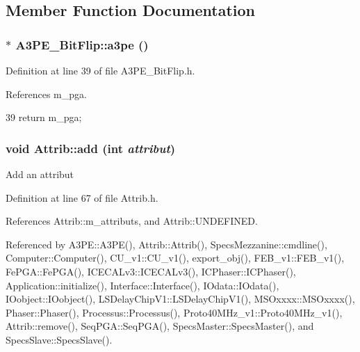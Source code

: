 \subsection{Member Function Documentation}
\hypertarget{classA3PE__BitFlip_ac0d0747dfdd99084dd5524fea62f11d6}{
\subsubsection[{a3pe}]{$\ast$ A3PE\_\-BitFlip::a3pe ()}}
\label{classA3PE__BitFlip_ac0d0747dfdd99084dd5524fea62f11d6}


Definition at line 39 of file A3PE\_\-BitFlip.h.

References m\_\-pga.


\begin{DoxyCode}
39 {return m_pga;}
\end{DoxyCode}
\hypertarget{classAttrib_a235f773af19c900264a190b00a3b4ad7}{
\subsubsection[{add}]{\setlength{\rightskip}{0pt plus 5cm}void Attrib::add (int {\em attribut})}}
\label{classAttrib_a235f773af19c900264a190b00a3b4ad7}
Add an attribut 

Definition at line 67 of file Attrib.h.

References Attrib::m\_\-attributs, and Attrib::UNDEFINED.

Referenced by A3PE::A3PE(), Attrib::Attrib(), SpecsMezzanine::cmdline(), Computer::Computer(), CU\_\-v1::CU\_\-v1(), export\_\-obj(), FEB\_\-v1::FEB\_\-v1(), FePGA::FePGA(), ICECALv3::ICECALv3(), ICPhaser::ICPhaser(), Application::initialize(), Interface::Interface(), IOdata::IOdata(), IOobject::IOobject(), LSDelayChipV1::LSDelayChipV1(), MSOxxxx::MSOxxxx(), Phaser::Phaser(), Processus::Processus(), Proto40MHz\_\-v1::Proto40MHz\_\-v1(), Attrib::remove(), SeqPGA::SeqPGA(), SpecsMaster::SpecsMaster(), and SpecsSlave::SpecsSlave().


